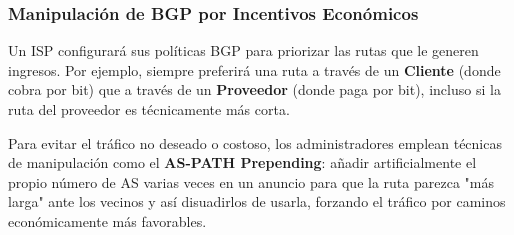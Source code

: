\subsubsection{Manipulación de BGP por Incentivos Económicos}

Un ISP configurará sus políticas BGP para priorizar las rutas que le generen ingresos. Por ejemplo, siempre preferirá una ruta a través de un \textbf{Cliente} (donde cobra por bit) que a través de un \textbf{Proveedor} (donde paga por bit), incluso si la ruta del proveedor es técnicamente más corta.

Para evitar el tráfico no deseado o costoso, los administradores emplean técnicas de manipulación como el \textbf{AS-PATH Prepending}: añadir artificialmente el propio número de AS varias veces en un anuncio para que la ruta parezca "más larga" ante los vecinos y así disuadirlos de usarla, forzando el tráfico por caminos económicamente más favorables.
